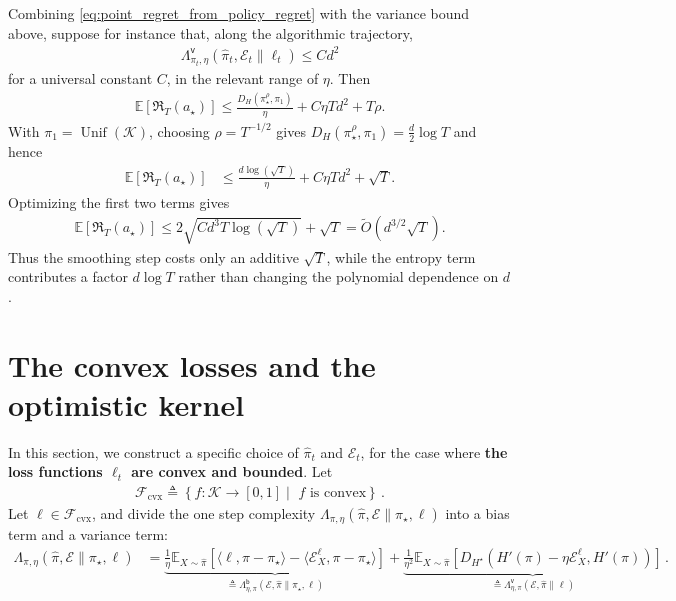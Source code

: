 \documentclass{article}
\theoremstyle{plain}
\theoremstyle{definition}
\theoremstyle{plain}
\newcommand{\Reg}{\mathfrak{R}}
\newcommand{\E}{\mathbb E}
\newcommand{\K}{\mathcal K}
\newcommand{\cE}{\mathcal E}
\newcommand{\cF}{\mathcal F}
\begin{document}
Combining \eqref{eq:point_regret_from_policy_regret} with the variance bound above, suppose for instance
that, along the algorithmic trajectory,
\begin{align}
    \Lambda^{\mathsf v}_{\pi_t,\eta}(\hat\pi_t,\cE_t\|\ell_t)
    \leq
    C d^2
\end{align}
for a universal constant $C$, in the relevant range of $\eta$.  Then
\begin{align}
    \E[\Reg_T(a_\star)]
    \leq
    \frac{D_H(\pi_\star^\rho,\pi_1)}{\eta}
    +
    C\eta T d^2
    +
    T\rho .
    \label{eq:point_regret_smoothed_bound}
\end{align}
With $\pi_1=\operatorname{Unif}(\K)$, choosing $\rho=T^{-1/2}$ gives
$D_H(\pi_\star^\rho,\pi_1)=\frac d2\log T$ and hence
\begin{align}
    \E[\Reg_T(a_\star)]
     & \leq
    \frac{d\log(\sqrt T)}{\eta}
    +
    C\eta T d^2
    +
    \sqrt T .
\end{align}
Optimizing the first two terms gives
\begin{align}
    \E[\Reg_T(a_\star)]
    \leq
    2\sqrt{C d^3 T\log(\sqrt T)}+
    \sqrt T
    =
    \tilde O(d^{3/2}\sqrt T).
    \label{eq:point_regret_final_d_32}
\end{align}
Thus the smoothing step costs only an additive $\sqrt T$, while the entropy term contributes a factor
$d\log T$ rather than changing the polynomial dependence on $d$.


\newpage
\section{The convex losses and the optimistic kernel}
In this section, we construct a specific choice of $\hat{\pi}_t$ and $\cE_t$,
for the case where \textbf{the loss functions $\ell_t$ are convex and bounded}.
Let
\begin{align}
    \cF_{\mathrm{cvx}} \triangleq \left\{f:\K\to[0, 1] \middle| \,\, f \text{ is convex}\right\}\,.
\end{align}
Let $\ell \in \cF_{\mathrm{cvx}}$, and divide the one step complexity $\Lambda_{\pi,\eta}(\hat{\pi},\cE \| \pi_\star, \ell)$ into a bias term and a variance term:
\begin{align}
    \Lambda_{\pi,\eta}(\hat{\pi},\cE \| \pi_\star,\ell)
     & =
    \underbrace{
        \frac{1}{\eta}
        \E_{X\sim\hat{\pi}}\left[
            \langle \ell,\hat{\pi}-\pi_\star\rangle
            -
            \langle \cE_X^\ell,\pi-\pi_\star\rangle
            \right]
    }_{\triangleq \Lambda^{\mathsf{b}}_{\eta,\pi}(\cE,\hat{\pi}\| \pi_\star,\ell)}
    +
    \underbrace{
        \frac{1}{\eta^2}
        \E_{X\sim\hat{\pi}}\left[
            D_{H^\star}
            \left(
            H'(\pi)-\eta \cE_X^\ell,
            H'(\pi)
            \right)
            \right]
    }_{\triangleq \Lambda^{\mathsf{v}}_{\eta,\pi}(\cE,\hat{\pi}\|\ell)}\,.
\end{align}
\end{document}
